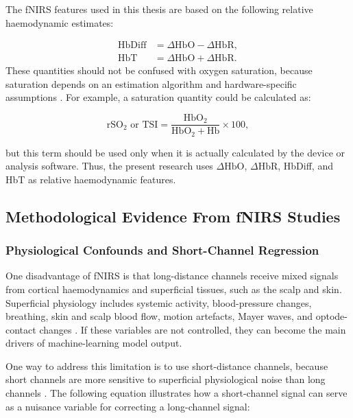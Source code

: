 The fNIRS features used in this thesis are based on the following relative haemodynamic estimates:

\begin{align}
\mathrm{HbDiff} &= \Delta \mathrm{HbO}-\Delta \mathrm{HbR},\\
\mathrm{HbT} &= \Delta \mathrm{HbO}+\Delta \mathrm{HbR}.
\end{align}
These quantities should not be confused with oxygen saturation, because saturation depends on an
estimation algorithm and hardware-specific assumptions \cite{Amendola2023,Stute2025}. For example, a
saturation quantity could be calculated as:

\begin{equation}
\mathrm{rSO}_2 \text{ or TSI} =
\frac{\mathrm{HbO}_2}{\mathrm{HbO}_2+\mathrm{Hb}}\times100,
\end{equation}

but this term should be used only when it is actually calculated by the device or analysis software.
Thus, the present research uses \(\Delta \mathrm{HbO}\), \(\Delta \mathrm{HbR}\), HbDiff, and HbT as
relative haemodynamic features.

\subsection{Methodological Evidence From fNIRS Studies}

\subsubsection{Physiological Confounds and Short-Channel Regression}

One disadvantage of fNIRS is that long-distance channels receive mixed signals from cortical
haemodynamics and superficial tissues, such as the scalp and skin. Superficial physiology includes
systemic activity, blood-pressure changes, breathing, skin and scalp blood flow, motion artefacts,
Mayer waves, and optode-contact changes \cite{Scholkmann2022,Klein2024}. If these variables are not
controlled, they can become the main drivers of machine-learning model output.

One way to address this limitation is to use short-distance channels, because short channels are
more sensitive to superficial physiological noise than long channels
\cite{Wyser2022,Klein2023,An2025}. The following equation illustrates how a short-channel signal can
serve as a nuisance variable for correcting a long-channel signal:

